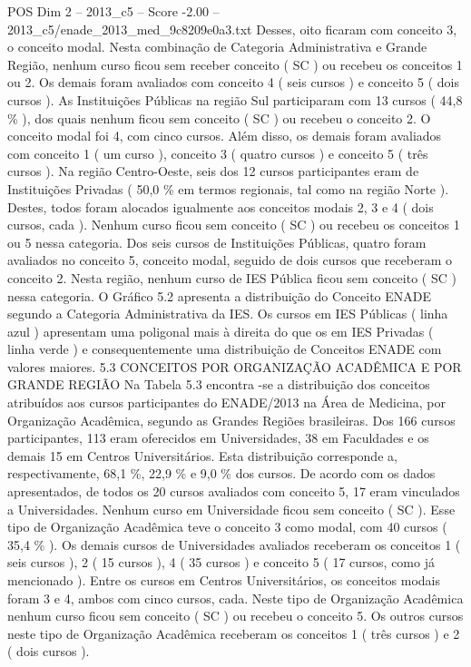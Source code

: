 \begin{textsample}{POS Dim 2 – 2013\_c5 – Score -2.00 – 2013\_c5/enade\_2013\_med\_9c8209e0a3.txt}
Desses, oito ficaram com conceito 3, o conceito modal.
Nesta combinação de Categoria Administrativa e Grande Região, nenhum curso ficou sem receber conceito ( SC ) ou recebeu os conceitos 1 ou 2.
Os demais foram avaliados com conceito 4 ( seis cursos ) e conceito 5 ( dois cursos ).
As Instituições Públicas na região Sul participaram com 13 cursos ( 44,8 \% ), dos quais nenhum ficou sem conceito ( SC ) ou recebeu o conceito 2.
O conceito modal foi 4, com cinco cursos.
Além disso, os demais foram avaliados com conceito 1 ( um curso ), conceito 3 ( quatro cursos ) e conceito 5 ( três cursos ).
Na região Centro-Oeste, seis dos 12 cursos participantes eram de Instituições Privadas ( 50,0 \% em termos regionais, tal como na região Norte ).
Destes, todos foram alocados igualmente aos conceitos modais 2, 3 e 4 ( dois cursos, cada ).
Nenhum curso ficou sem conceito ( SC ) ou recebeu os conceitos 1 ou 5 nessa categoria.
Dos seis cursos de Instituições Públicas, quatro foram avaliados no conceito 5, conceito modal, seguido de dois cursos que receberam o conceito 2.
Nesta região, nenhum curso de IES Pública ficou sem conceito ( SC ) nessa categoria.
O Gráfico 5.2 apresenta a distribuição do Conceito ENADE segundo a Categoria Administrativa da IES.
Os cursos em IES Públicas ( linha azul ) apresentam uma poligonal mais à direita do que os em IES Privadas ( linha verde ) e consequentemente uma distribuição de Conceitos ENADE com valores maiores. 5.3 CONCEITOS POR ORGANIZAÇÃO ACADÊMICA E POR GRANDE REGIÃO Na Tabela 5.3 encontra -se a distribuição dos conceitos atribuídos aos cursos participantes do ENADE/2013 na Área de Medicina, por Organização Acadêmica, segundo as Grandes Regiões brasileiras.
Dos 166 cursos participantes, 113 eram oferecidos em Universidades, 38 em Faculdades e os demais 15 em Centros Universitários.
Esta distribuição corresponde a, respectivamente, 68,1 \%, 22,9 \% e 9,0 \% dos cursos.
De acordo com os dados apresentados, de todos os 20 cursos avaliados com conceito 5, 17 eram vinculados a Universidades.
Nenhum curso em Universidade ficou sem conceito ( SC ).
Esse tipo de Organização Acadêmica teve o conceito 3 como modal, com 40 cursos ( 35,4 \% ).
Os demais cursos de Universidades avaliados receberam os conceitos 1 ( seis cursos ), 2 ( 15 cursos ), 4 ( 35 cursos ) e conceito 5 ( 17 cursos, como já mencionado ).
Entre os cursos em Centros Universitários, os conceitos modais foram 3 e 4, ambos com cinco cursos, cada.
Neste tipo de Organização Acadêmica nenhum curso ficou sem conceito ( SC ) ou recebeu o conceito 5.
Os outros cursos neste tipo de Organização Acadêmica receberam os conceitos 1 ( três cursos ) e 2 ( dois cursos ).

\end{textsample}
